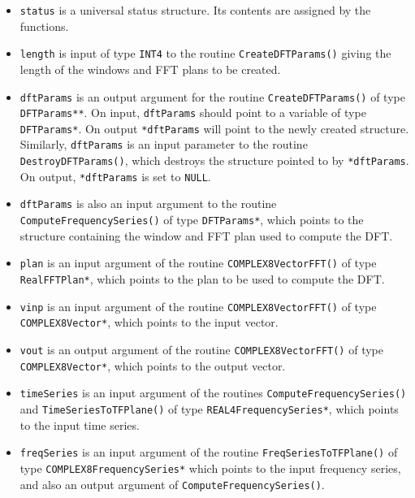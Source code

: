 \documentclass{article}
\begin{document}
\begin{itemize}
\item \texttt{status} is a universal status structure.  Its contents are
assigned by the functions.

\item \texttt{length} is input of type \verb+INT4+ to the routine
\verb+CreateDFTParams()+ giving the length of the windows and FFT
plans to be created.   

\item \texttt{dftParams} is an output argument for the routine
\verb+CreateDFTParams()+ of type \verb+DFTParams**+.  On input,
\verb+dftParams+ should point to a variable of type \verb+DFTParams*+.
On output \verb+*dftParams+ will point to the newly created structure.  
Similarly, \verb+dftParams+ is an input parameter to the routine
\verb+DestroyDFTParams()+, which destroys the structure pointed to by
\verb+*dftParams+.  On output, \verb+*dftParams+ is set to \verb+NULL+.

\item \texttt{dftParams} is also an input argument to the routine
\verb+ComputeFrequencySeries()+ of type \verb+DFTParams*+, which points
to the structure containing the window and FFT plan used to compute
the DFT.

\item \texttt{plan} is an input argument of the routine
\verb+COMPLEX8VectorFFT()+ of type \verb+RealFFTPlan*+, which points
to the plan to be used to compute the DFT.  

\item \texttt{vinp} is an input argument of the routine
\verb+COMPLEX8VectorFFT()+ of type \verb+COMPLEX8Vector*+, which points
to the input vector.

\item \texttt{vout} is an output argument of the routine
\verb+COMPLEX8VectorFFT()+ of type \verb+COMPLEX8Vector*+, which points
to the output vector.

\item \texttt{timeSeries} is an input argument of the routines
\verb+ComputeFrequencySeries()+ and \verb+TimeSeriesToTFPlane()+
of type \verb+REAL4FrequencySeries*+, which points to the input time
series. 

\item \texttt{freqSeries} is an input argument of the routine
\verb+FreqSeriesToTFPlane()+ of type
\verb+COMPLEX8FrequencySeries*+ which points to the input frequency
series, and also an output argument of \verb+ComputeFrequencySeries()+.


\end{itemize}
\end{document}
